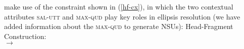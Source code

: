 %
\citet[304]{Ginzburg:Sag:2000} make use of the constraint shown in (\ref{hf-cx}), in which 
the two contextual attributes \textsc{sal-utt} and \textsc{max-qud} play key roles in ellipsis resolution
(we have added information about the \textsc{max-qud} to generate NSUs):
%
\eas
\label{hf-cx}
Head-Fragment Construction:\\
$\rightarrow$

